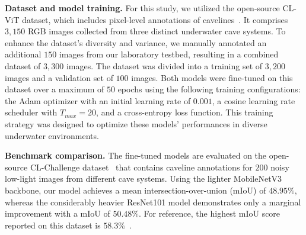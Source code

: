 \vspace{1mm}
\noindent
\textbf{Dataset and model training.} 
For this study, we utilized the open-source CL-ViT dataset, which includes pixel-level annotations of cavelines~\cite{yu2023weakly}. It comprises $3,150$ RGB images collected from three distinct underwater cave systems. To enhance the dataset's diversity and variance, we manually annotated an additional $150$ images from our laboratory testbed, resulting in a combined dataset of $3,300$ images. The dataset was divided into a training set of $3,200$ images and a validation set of $100$ images. Both models were fine-tuned on this dataset over a maximum of $50$ epochs using the following training configurations: the Adam optimizer with an initial learning rate of $0.001$, a cosine learning rate scheduler with $T_{max} = 20$, and a cross-entropy loss function. This training strategy was designed to optimize these models' performances in diverse underwater environments.
 

\vspace{1mm}
\noindent
\textbf{Benchmark comparison.} The fine-tuned models are evaluated on the open-source CL-Challenge dataset~\cite{yu2023weakly} that contains caveline annotations for $200$ noisy low-light images from different cave systems. Using the lighter MobileNetV3 backbone, our model achieves a mean intersection-over-union (mIoU) of $48.95\%$, whereas the considerably heavier ResNet101 model demonstrates only a marginal improvement with a mIoU of $50.48\%$. For reference, the highest mIoU score reported on this dataset is $58.3\%$~\cite{yu2023weakly}.





